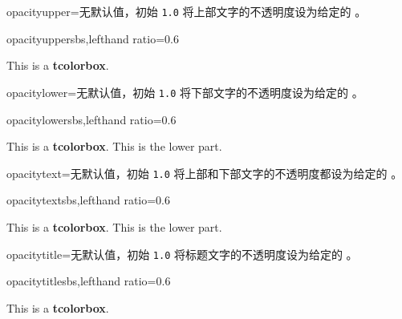 \clearpage
\begin{docTcbKey}{opacityupper}{=}{无默认值，初始 \texttt{1.0}}
  将上部文字的不透明度设为给定的 。
\begin{exdispExample*}{opacityupper}{sbs,lefthand ratio=0.6}
\begin{tcolorbox}[enhanced,opacityupper=0.5,
  interior style={preaction={fill=white},pattern=checkerboard,pattern color=gray!40}]
This is a \textbf{tcolorbox}.
\end{tcolorbox}
\end{exdispExample*}
\end{docTcbKey}


\begin{docTcbKey}{opacitylower}{=}{无默认值，初始 \texttt{1.0}}
  将下部文字的不透明度设为给定的 。
\begin{exdispExample*}{opacitylower}{sbs,lefthand ratio=0.6}
\begin{tcolorbox}[enhanced,opacitylower=0.5,
  interior style={preaction={fill=white},pattern=checkerboard,pattern color=gray!40}]
This is a \textbf{tcolorbox}.
\tcblower
This is the lower part.
\end{tcolorbox}
\end{exdispExample*}
\end{docTcbKey}

\begin{docTcbKey}{opacitytext}{=}{无默认值，初始 \texttt{1.0}}
  将上部和下部文字的不透明度都设为给定的 。
\begin{exdispExample*}{opacitytext}{sbs,lefthand ratio=0.6}
\begin{tcolorbox}[enhanced,opacitytext=0.5,
  interior style={preaction={fill=white},pattern=checkerboard,pattern color=gray!40}]
This is a \textbf{tcolorbox}.
\tcblower
This is the lower part.
\end{tcolorbox}
\end{exdispExample*}
\end{docTcbKey}


\begin{docTcbKey}{opacitytitle}{=}{无默认值，初始 \texttt{1.0}}
  将标题文字的不透明度设为给定的 。
\begin{exdispExample*}{opacitytitle}{sbs,lefthand ratio=0.6}
\begin{tcolorbox}[enhanced,opacitytitle=0.7,
  coltitle=black,
  fonttitle=\bfseries,title=This is a title,
  title style={preaction={fill=white},pattern=checkerboard,pattern color=gray!40}]
This is a \textbf{tcolorbox}.
\end{tcolorbox}
\end{exdispExample*}
\end{docTcbKey}


